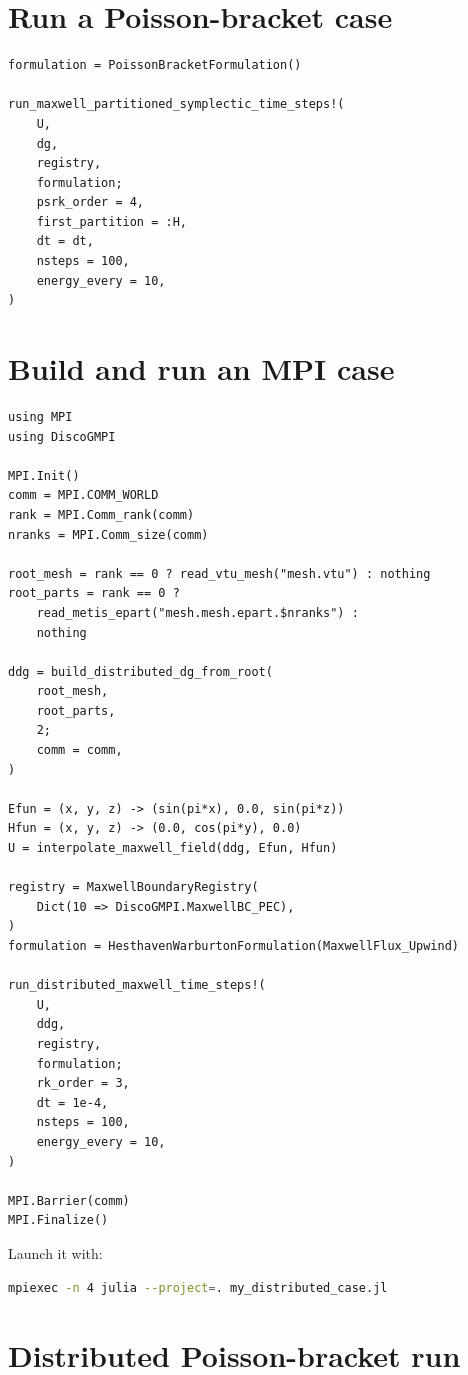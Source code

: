\documentclass[11pt,oneside]{book}
\begin{document}
\section{Run a Poisson-bracket case}

\begin{lstlisting}
formulation = PoissonBracketFormulation()

run_maxwell_partitioned_symplectic_time_steps!(
    U,
    dg,
    registry,
    formulation;
    psrk_order = 4,
    first_partition = :H,
    dt = dt,
    nsteps = 100,
    energy_every = 10,
)
\end{lstlisting}

\section{Build and run an MPI case}

\begin{lstlisting}
using MPI
using DiscoGMPI

MPI.Init()
comm = MPI.COMM_WORLD
rank = MPI.Comm_rank(comm)
nranks = MPI.Comm_size(comm)

root_mesh = rank == 0 ? read_vtu_mesh("mesh.vtu") : nothing
root_parts = rank == 0 ?
    read_metis_epart("mesh.mesh.epart.$nranks") :
    nothing

ddg = build_distributed_dg_from_root(
    root_mesh,
    root_parts,
    2;
    comm = comm,
)

Efun = (x, y, z) -> (sin(pi*x), 0.0, sin(pi*z))
Hfun = (x, y, z) -> (0.0, cos(pi*y), 0.0)
U = interpolate_maxwell_field(ddg, Efun, Hfun)

registry = MaxwellBoundaryRegistry(
    Dict(10 => DiscoGMPI.MaxwellBC_PEC),
)
formulation = HesthavenWarburtonFormulation(MaxwellFlux_Upwind)

run_distributed_maxwell_time_steps!(
    U,
    ddg,
    registry,
    formulation;
    rk_order = 3,
    dt = 1e-4,
    nsteps = 100,
    energy_every = 10,
)

MPI.Barrier(comm)
MPI.Finalize()
\end{lstlisting}

Launch it with:

\begin{lstlisting}[language=bash]
mpiexec -n 4 julia --project=. my_distributed_case.jl
\end{lstlisting}

\section{Distributed Poisson-bracket run}
\end{document}
